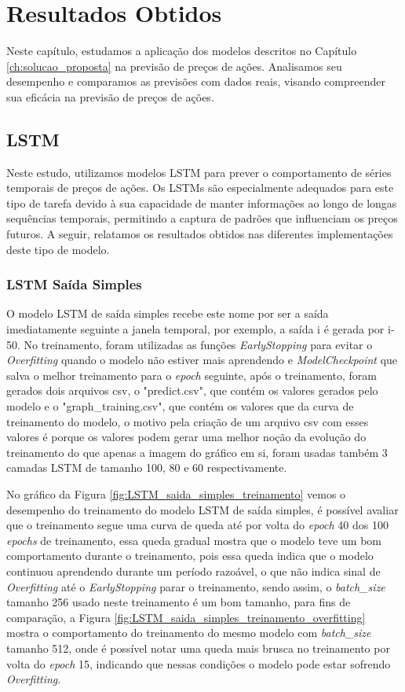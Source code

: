 \chapter{Resultados Obtidos}
\label{ch:resultados_esperados}

Neste capítulo, estudamos a aplicação dos modelos descritos no Capítulo \ref{ch:solucao_proposta} na previsão de preços de ações. Analisamos seu desempenho e comparamos as previsões com dados reais, visando compreender sua eficácia na previsão de preços de ações.

\section{LSTM}

Neste estudo, utilizamos modelos LSTM para prever o comportamento de séries temporais de preços de ações. Os LSTMs são especialmente adequados para este tipo de tarefa devido à sua capacidade de manter informações ao longo de longas sequências temporais, permitindo a captura de padrões que influenciam os preços futuros. A seguir, relatamos os resultados obtidos nas diferentes implementações deste tipo de modelo.

\subsection{LSTM Saída Simples}

O modelo LSTM de saída simples recebe este nome por ser a saída imediatamente seguinte a janela temporal, por exemplo, a saída i é gerada por i-50. No treinamento, foram utilizadas as funções \textit{EarlyStopping} para evitar o \textit{Overfitting} quando o modelo não estiver mais aprendendo e \textit{ModelCheckpoint} que salva o melhor treinamento para o \textit{epoch} seguinte, após o treinamento, foram gerados dois arquivos csv, o "predict.csv", que contém os valores gerados pelo modelo e o "graph\_training.csv", que contém os valores que da curva de treinamento do modelo, o motivo pela criação de um arquivo csv com esses valores é porque os valores podem gerar uma melhor noção da evolução do treinamento do que apenas a imagem do gráfico em si, foram usadas também 3 camadas LSTM de tamanho 100, 80 e 60 respectivamente.
\par No gráfico da Figura \ref{fig:LSTM_saida_simples_treinamento} vemos o desempenho do treinamento do modelo LSTM de saída simples, é possível avaliar que o treinamento segue uma curva de queda até por volta do \textit{epoch} 40 dos 100 \textit{epochs} de treinamento, essa queda gradual mostra que o modelo teve um bom comportamento durante o treinamento, pois essa queda indica que o modelo continuou aprendendo durante um período razoável, o que não indica sinal de \textit{Overfitting} até o \textit{EarlyStopping} parar o treinamento, sendo assim, o \textit{batch\_size} tamanho 256 usado neste treinamento é um bom tamanho, para fins de comparação, a Figura \ref{fig:LSTM_saida_simples_treinamento_overfitting} mostra o comportamento do treinamento do mesmo modelo com \textit{batch\_size} tamanho 512, onde é possível notar uma queda mais brusca no treinamento por volta do \textit{epoch} 15, indicando que nessas condições o modelo pode estar sofrendo \textit{Overfitting}.

